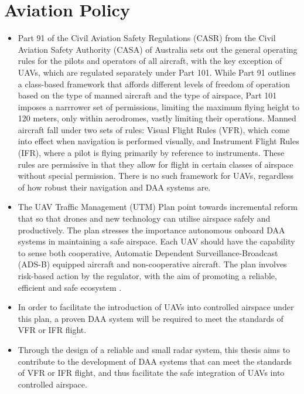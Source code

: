 \section{Aviation Policy}
\begin{itemize}
    \item Part 91 of the Civil Aviation Safety Regulations (CASR) from the Civil Aviation Safety Authority (CASA) of Australia sets out the general operating rules for the pilots and operators of all aircraft, with the key exception of UAVs, which are regulated separately under Part 101. While Part 91 outlines a class-based framework that affords different levels of freedom of operation based on the type of manned aircraft and the type of airspace, Part 101 imposes a narrrower set of permissions, limiting the maximum flying height to 120 meters, only within aerodromes, vastly limiting their operations. Manned aircraft fall under two sets of rules: Visual Flight Rules (VFR), which come into effect when navigation is performed visually, and Instrument Flight Rules (IFR), where a pilot is flying primarily by reference to instruments. These rules are permissive in that they allow for flight in certain classes of airspace without special permission. There is no such framework for UAVs, regardless of how robust their navigation and DAA systems are. 
    \item  The UAV Traffic Management (UTM) Plan point towards incremental reform that so that drones and new technology can utilise airspace safely and productively. The plan stresses the importance autonomous onboard DAA systems in maintaining a safe airspace. Each UAV should have the capability to sense both cooperative, Automatic Dependent Surveillance-Broadcast (ADS-B) equipped aircraft and non-cooperative aircraft. The plan involves risk-based action by the regulator, with the aim of promoting a reliable, efficient and safe ecosystem \cite{}. 
    \item In order to facilitate the introduction of UAVs into controlled airspace under this plan, a proven DAA system will be required to meet the standards of VFR or IFR flight. 
    \item Through the design of a reliable and small radar system, this thesis aims to contribute to the development of DAA systems that can meet the standards of VFR or IFR flight, and thus facilitate the safe integration of UAVs into controlled airspace.        
\end{itemize}

